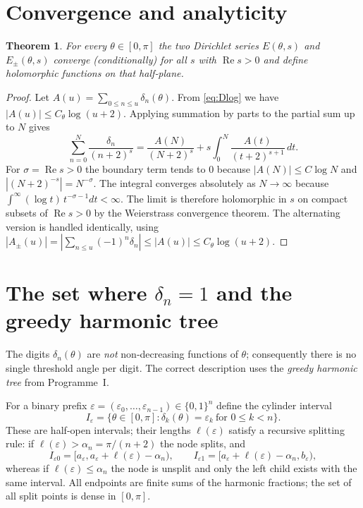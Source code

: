 \documentclass[11pt,a4paper]{article}
\newtheorem{theorem}{Theorem}[section]
\theoremstyle{definition}
\theoremstyle{remark}
\begin{document}
\section{Convergence and analyticity}
\begin{theorem}\label{thm:conv}
For every \(\theta\in[0,\pi]\) the two Dirichlet series \(E(\theta,s)\) and \(E_{\pm}(\theta,s)\) converge (conditionally) for all \(s\) with \(\operatorname{Re}s>0\) and define holomorphic functions on that half‑plane.
\end{theorem}
\begin{proof}
Let \(A(u)=\sum_{0\le n\le u}\delta_n(\theta)\).  From \eqref{eq:Dlog} we have \(|A(u)|\le C_\theta\log(u+2)\).
Applying summation by parts to the partial sum up to \(N\) gives
\[
\sum_{n=0}^{N}\frac{\delta_n}{(n+2)^s}
= \frac{A(N)}{(N+2)^s} + s\int_{0}^{N}\frac{A(t)}{(t+2)^{s+1}}\,dt .
\]
For \(\sigma=\operatorname{Re}s>0\) the boundary term tends to \(0\) because \(|A(N)|\le C\log N\) and \(|(N+2)^{-s}|=N^{-\sigma}\).
The integral converges absolutely as \(N\to\infty\) because \(\int^{\infty}(\log t)\,t^{-\sigma-1}dt<\infty\).
The limit is therefore holomorphic in \(s\) on compact subsets of \(\operatorname{Re}s>0\) by the Weierstrass convergence theorem.
The alternating version is handled identically, using \(|A_{\pm}(u)|=|\sum_{n\le u}(-1)^n\delta_n|\le |A(u)|\le C_\theta\log(u+2)\).
\end{proof}

\section{The set where \(\delta_n=1\) and the greedy harmonic tree}
The digits \(\delta_n(\theta)\) are \emph{not} non‑decreasing functions of \(\theta\); consequently there is no single threshold angle per digit.
The correct description uses the \emph{greedy harmonic tree} from Programme~I.

For a binary prefix \(\varepsilon=(\varepsilon_0,\dots,\varepsilon_{n-1})\in\{0,1\}^n\) define the cylinder interval
\[
I_{\varepsilon} = \{\theta\in[0,\pi] : \delta_k(\theta)=\varepsilon_k\ \text{for } 0\le k<n\}.
\]
These are half‑open intervals; their lengths \(\ell(\varepsilon)\) satisfy a recursive splitting rule:
if \(\ell(\varepsilon)>\alpha_n=\pi/(n+2)\) the node splits, and
\[
I_{\varepsilon 0}=[a_\varepsilon, a_\varepsilon+\ell(\varepsilon)-\alpha_n),\qquad
I_{\varepsilon 1}=[a_\varepsilon+\ell(\varepsilon)-\alpha_n, b_\varepsilon),
\]
whereas if \(\ell(\varepsilon)\le\alpha_n\) the node is unsplit and only the left child exists with the same interval.
All endpoints are finite sums of the harmonic fractions; the set of all split points is dense in \([0,\pi]\).
\end{document}
